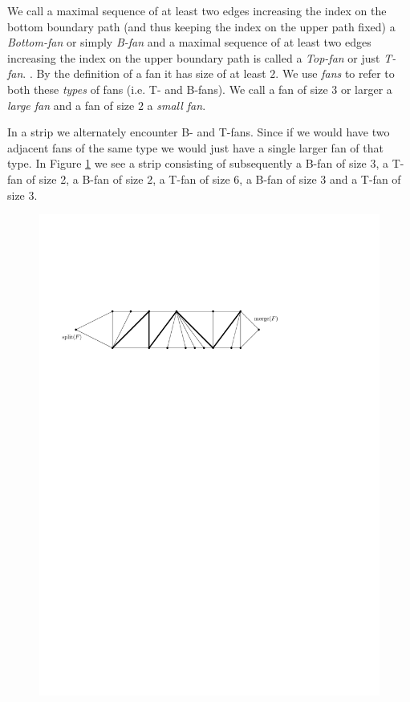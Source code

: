     We call a maximal sequence of at least two edges increasing the index on the bottom boundary path (and thus keeping the index on the upper path fixed) a \emph{Bottom-fan} or simply \emph{B-fan} and a maximal sequence of at least two edges increasing the index on the upper boundary path is called a \emph{Top-fan} or just \emph{T-fan}. . By the definition of a fan it has size of at least $2$.
    We use \emph{fans} to refer to both these \emph{types} of fans (i.e. T- and B-fans).
    We call a fan of size $3$ or larger a \emph{large fan} and a fan of size $2$ a \emph{small fan}.

    In a strip we alternately encounter B- and T-fans. Since if we would have two adjacent fans of the same type we would just have a single larger fan of that type.
    In Figure \ref{fig:uni:fans} we see a strip consisting of subsequently a B-fan of size $3$, a T-fan of size 2, a B-fan of size $2$, a T-fan of size $6$, a B-fan of size $3$ and a T-fan of size $3$.

    \begin{figure}[h]
      \centering
      \includegraphics[scale=.9]{rectangularDuals/img/fans}
      \caption{}
      \label{fig:uni:fans}
    \end{figure}


